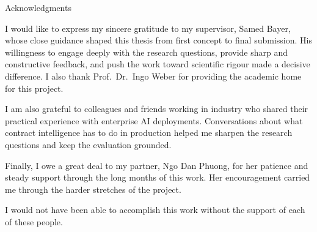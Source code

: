 \thispagestyle{empty}

\vspace*{20mm}

\begin{center}
{ Acknowledgments}
\end{center}

\vspace{10mm}

I would like to express my sincere gratitude to my supervisor, Samed Bayer, whose
close guidance shaped this thesis from first concept to final submission. His
willingness to engage deeply with the research questions, provide sharp and
constructive feedback, and push the work toward scientific rigour made a decisive
difference. I also thank Prof.\ Dr.\ Ingo Weber for providing the academic home
for this project.

I am also grateful to colleagues and friends working in industry who shared their
practical experience with enterprise AI deployments. Conversations about what
contract intelligence has to do in production helped me sharpen the research
questions and keep the evaluation grounded.

Finally, I owe a great deal to my partner, Ngo Dan Phuong, for her patience and
steady support through the long months of this work. Her encouragement carried me
through the harder stretches of the project.

I would not have been able to accomplish this work without the support of each of
these people.

\cleardoublepage{}

